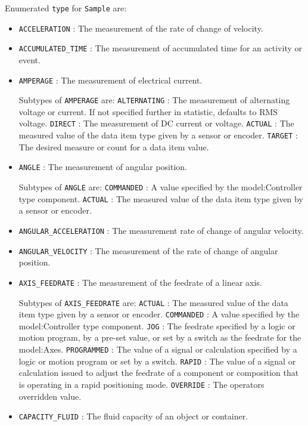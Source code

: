  Enumerated \texttt{type} for \texttt{Sample} are:
\begin{itemize}

\item \texttt{ACCELERATION} : The measurement of the rate of change of velocity. 

\item \texttt{ACCUMULATED_TIME} : The measurement of accumulated time for an activity or event. 

\item \texttt{AMPERAGE} : The measurement of electrical current. 

Subtypes of \texttt{AMPERAGE} are: 
\newline\tab \texttt{ALTERNATING} : The measurement of alternating voltage or current.   If not specified further in statistic, defaults to RMS voltage.  
\newline\tab \texttt{DIRECT} : The measurement of DC current or voltage. 
\newline\tab \texttt{ACTUAL} : The measured value of the data item type given by a sensor or encoder. 
\newline\tab \texttt{TARGET} : The desired measure or count for a data item value. 
\item \texttt{ANGLE} : The measurement of angular position. 

Subtypes of \texttt{ANGLE} are: 
\newline\tab \texttt{COMMANDED} : A value specified by the {model:Controller} type component. 
\newline\tab \texttt{ACTUAL} : The measured value of the data item type given by a sensor or encoder. 
\item \texttt{ANGULAR_ACCELERATION} : The measurement rate of change of angular velocity. 

\item \texttt{ANGULAR_VELOCITY} : The measurement of the rate of change of angular position. 

\item \texttt{AXIS_FEEDRATE} : The measurement of the feedrate of a linear axis. 

Subtypes of \texttt{AXIS_FEEDRATE} are: 
\newline\tab \texttt{ACTUAL} : The measured value of the data item type given by a sensor or encoder. 
\newline\tab \texttt{COMMANDED} : A value specified by the {model:Controller} type component. 
\newline\tab \texttt{JOG} : The feedrate specified by a logic or motion program, by a pre-set value, or set by a switch as the feedrate for the {model:Axes}.  
\newline\tab \texttt{PROGRAMMED} : The value of a signal or calculation specified by a logic or motion program or set by a switch. 
\newline\tab \texttt{RAPID} : The value of a signal or calculation issued to adjust the feedrate of a component or composition that is operating in a rapid positioning mode. 
\newline\tab \texttt{OVERRIDE} : The operators overridden value. 
\item \texttt{CAPACITY_FLUID} : The fluid capacity of an object or container. 


\end{itemize}
